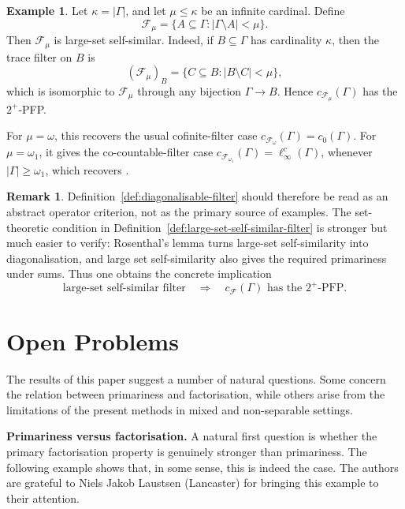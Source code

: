 \documentclass[11pt]{amsart}
\newcommand{\runinhead}[1]{%
  \par\medskip\noindent\textbf{#1.}\enspace\ignorespaces
}
\theoremstyle{plain}
\theoremstyle{definition}
\newtheorem{remark}[theorem]{Remark}
\newtheorem{example}[theorem]{Example}
\numberwithin{equation}{section}
\renewcommand{\leq}{\leqslant}
\renewcommand{\geq}{\geqslant}
\begin{document}
\begin{example}\label{ex:co-small-filters}
Let \(\kappa=|\Gamma|\), and let \(\mu\leq\kappa\) be an infinite cardinal. Define
\[
    \mathcal F_\mu
    =\{A\subseteq\Gamma: |\Gamma\setminus A|<\mu\}.
\]
Then \(\mathcal F_\mu\) is large-set self-similar.  Indeed, if \(B\subseteq\Gamma\) has cardinality \(\kappa\), then the trace filter on \(B\) is
\[
    (\mathcal F_\mu)_B
    =\{C\subseteq B: |B\setminus C|<\mu\},
\]
which is isomorphic to \(\mathcal F_\mu\) through any bijection
\(\Gamma\to B\).  Hence
\(
    c_{\mathcal F_\mu}(\Gamma)
\)
has the \(2^+\)-PFP.

For \(\mu=\omega\), this recovers the usual cofinite-filter case
\(c_{\mathcal F_\omega}(\Gamma)=c_0(\Gamma)\).  For
\(\mu=\omega_1\), it gives the co-countable-filter case
\(c_{\mathcal F_{\omega_1}}(\Gamma)=\ell_\infty^c(\Gamma)\), whenever
\(|\Gamma|\geq\omega_1\), which recovers \cite[Theorem 1.4]{JKS2016}.
\end{example}

\begin{remark}\label{rem:why-def-diag}
Definition~\ref{def:diagonalisable-filter} should therefore be read as an abstract operator criterion, not as the primary source of examples. The set-theoretic condition in Definition~\ref{def:large-set-self-similar-filter} is stronger but much easier to verify: Rosenthal's lemma turns large-set self-similarity into diagonalisation, and large set self-similarity also gives the required primariness under sums. Thus one obtains the concrete implication
\[
    \text{large-set self-similar filter}
    \quad\Longrightarrow\quad
    c_{\mathcal F}(\Gamma)\text{ has the }2^+\text{-PFP}.
\]
\end{remark}

\section{Open Problems}\label{sec:open-problems}

The results of this paper suggest a number of natural questions.
Some concern the relation between primariness and factorisation, while others arise from the limitations of the present methods in mixed and non-separable settings.

\runinhead{Primariness versus factorisation} A natural first question is whether the primary factorisation property is genuinely stronger than primariness. The following example shows that, in some sense, this is indeed the case. The authors are grateful to Niels Jakob Laustsen (Lancaster) for bringing this example to their attention.
\end{document}
